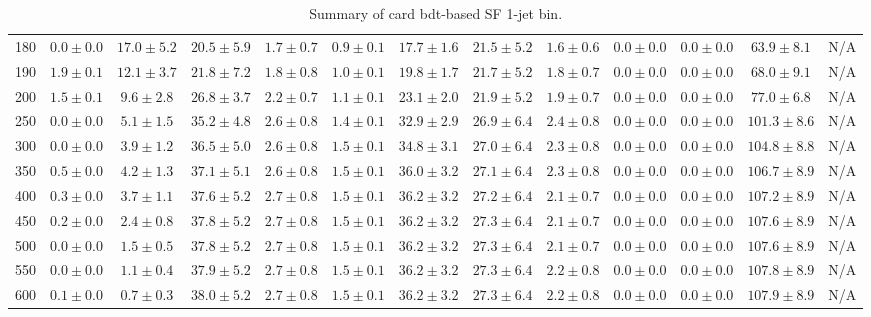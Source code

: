 \begin{table}
{\begin{center}
\begin{tabular}{l | c c | c c c c c c c c  | c c}
180 & $0.0\pm0.0$ & $17.0\pm5.2$ & $20.5\pm5.9$ & $1.7\pm0.7$ & $0.9\pm0.1$ & $17.7\pm1.6$ & $21.5\pm5.2$ & $1.6\pm0.6$ & $0.0\pm0.0$ & $0.0\pm0.0$ & $63.9\pm8.1$ & N/A \\
190 & $1.9\pm0.1$ & $12.1\pm3.7$ & $21.8\pm7.2$ & $1.8\pm0.8$ & $1.0\pm0.1$ & $19.8\pm1.7$ & $21.7\pm5.2$ & $1.8\pm0.7$ & $0.0\pm0.0$ & $0.0\pm0.0$ & $68.0\pm9.1$ & N/A \\
200 & $1.5\pm0.1$ & $9.6\pm2.8$ & $26.8\pm3.7$ & $2.2\pm0.7$ & $1.1\pm0.1$ & $23.1\pm2.0$ & $21.9\pm5.2$ & $1.9\pm0.7$ & $0.0\pm0.0$ & $0.0\pm0.0$ & $77.0\pm6.8$ & N/A \\
250 & $0.0\pm0.0$ & $5.1\pm1.5$ & $35.2\pm4.8$ & $2.6\pm0.8$ & $1.4\pm0.1$ & $32.9\pm2.9$ & $26.9\pm6.4$ & $2.4\pm0.8$ & $0.0\pm0.0$ & $0.0\pm0.0$ & $101.3\pm8.6$ & N/A \\
300 & $0.0\pm0.0$ & $3.9\pm1.2$ & $36.5\pm5.0$ & $2.6\pm0.8$ & $1.5\pm0.1$ & $34.8\pm3.1$ & $27.0\pm6.4$ & $2.3\pm0.8$ & $0.0\pm0.0$ & $0.0\pm0.0$ & $104.8\pm8.8$ & N/A \\
350 & $0.5\pm0.0$ & $4.2\pm1.3$ & $37.1\pm5.1$ & $2.6\pm0.8$ & $1.5\pm0.1$ & $36.0\pm3.2$ & $27.1\pm6.4$ & $2.3\pm0.8$ & $0.0\pm0.0$ & $0.0\pm0.0$ & $106.7\pm8.9$ & N/A \\
400 & $0.3\pm0.0$ & $3.7\pm1.1$ & $37.6\pm5.2$ & $2.7\pm0.8$ & $1.5\pm0.1$ & $36.2\pm3.2$ & $27.2\pm6.4$ & $2.1\pm0.7$ & $0.0\pm0.0$ & $0.0\pm0.0$ & $107.2\pm8.9$ & N/A \\
450 & $0.2\pm0.0$ & $2.4\pm0.8$ & $37.8\pm5.2$ & $2.7\pm0.8$ & $1.5\pm0.1$ & $36.2\pm3.2$ & $27.3\pm6.4$ & $2.1\pm0.7$ & $0.0\pm0.0$ & $0.0\pm0.0$ & $107.6\pm8.9$ & N/A \\
500 & $0.0\pm0.0$ & $1.5\pm0.5$ & $37.8\pm5.2$ & $2.7\pm0.8$ & $1.5\pm0.1$ & $36.2\pm3.2$ & $27.3\pm6.4$ & $2.1\pm0.7$ & $0.0\pm0.0$ & $0.0\pm0.0$ & $107.6\pm8.9$ & N/A \\
550 & $0.0\pm0.0$ & $1.1\pm0.4$ & $37.9\pm5.2$ & $2.7\pm0.8$ & $1.5\pm0.1$ & $36.2\pm3.2$ & $27.3\pm6.4$ & $2.2\pm0.8$ & $0.0\pm0.0$ & $0.0\pm0.0$ & $107.8\pm8.9$ & N/A \\
600 & $0.1\pm0.0$ & $0.7\pm0.3$ & $38.0\pm5.2$ & $2.7\pm0.8$ & $1.5\pm0.1$ & $36.2\pm3.2$ & $27.3\pm6.4$ & $2.2\pm0.8$ & $0.0\pm0.0$ & $0.0\pm0.0$ & $107.9\pm8.9$ & N/A \\
\hline
\end{tabular}
\end{center}
}
\caption{Summary of card bdt-based SF 1-jet bin.}
\end{table}
